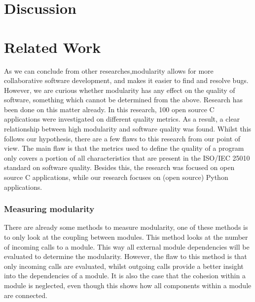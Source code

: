 \documentclass[twoside]{uva-inf-bachelor-thesis}
\begin{document}
\chapter{Discussion}

\chapter{Related Work}
As we can conclude from other researches\cite{LinuxKernel,lee2000linux},modularity allows for more collaborative software development, and makes it easier to find and resolve bugs. However, we are curious whether modularity has any effect on the quality of software, something which cannot be determined from the above. Research has been done on this matter already\cite{stamelos2002code}. In this research, 100 open source C applications were investigated on different quality metrics. As a result, a clear relationship between high modularity and software quality was found. Whilst this follows our hypothesis, there are a few flaws to this research from our point of view. The main flaw is that the metrics used to define the quality of a program only covers a portion of all characteristics that are present in the ISO/IEC 25010 standard on software quality\cite{ISO25010}. Besides this, the research was focused on open source C applications, while our research focuses on (open source) Python applications.

\subsection*{Measuring modularity}
There are already some methods to measure modularity, one of these methods is to only look at the coupling between modules\cite{BetterCodeHub,visser2016building}. This method looks at the number of incoming calls to a module. This way all external module dependencies will be evaluated to determine the modularity. However, the flaw to this method is that only incoming calls are evaluated, whilst outgoing calls provide a better insight into the dependencies of a module. It is also the case that the cohesion within a module is neglected, even though this shows how all components within a module are connected.
\end{document}
